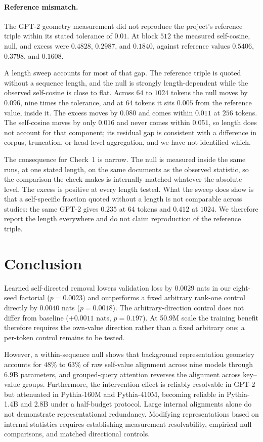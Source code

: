 \documentclass{article} %
\begin{document}
\paragraph{Reference mismatch.} The GPT-2 geometry measurement did not
reproduce the project's reference triple within its stated tolerance of
$0.01$. At block $512$ the measured self-cosine, null, and excess were
$0.4828$, $0.2987$, and $0.1840$, against reference values $0.5406$,
$0.3798$, and $0.1608$.

A length sweep accounts for most of that gap. The reference triple is quoted
without a sequence length, and the null is strongly length-dependent while the
observed self-cosine is close to flat. Across $64$ to $1024$ tokens the null
moves by $0.096$, nine times the tolerance, and at $64$ tokens it sits $0.005$
from the reference value, inside it. The excess moves by $0.080$ and comes
within $0.011$ at $256$ tokens. The self-cosine moves by only $0.016$ and
never comes within $0.051$, so length does not account for that component; its
residual gap is consistent with a difference in corpus, truncation, or
head-level aggregation, and we have not identified which.

The consequence for Check~1 is narrow. The null is measured inside the same
runs, at one stated length, on the same documents as the observed statistic,
so the comparison the check makes is internally matched whatever the absolute
level. The excess is positive at every length tested. What the sweep does show
is that a self-specific fraction quoted without a length is not comparable
across studies: the same GPT-2 gives $0.235$ at $64$ tokens and $0.412$ at
$1024$. We therefore report the length everywhere and do not claim
reproduction of the reference triple.

\section{Conclusion}

Learned self-directed removal lowers validation loss by $0.0029$ nats in our
eight-seed factorial ($p = 0.0023$) and outperforms a fixed arbitrary rank-one
control directly by $0.0040$ nats ($p = 0.0018$). The arbitrary-direction control
does not differ from baseline ($+0.0011$ nats, $p = 0.197$). At 50.9M scale the training benefit therefore
requires the own-value direction rather than a fixed arbitrary one; a
per-token control remains to be tested.

However, a within-sequence null shows that background representation geometry
accounts for $48\%$ to $63\%$ of raw self-value alignment across nine models
through 6.9B parameters, and grouped-query attention reverses the alignment
across key--value groups. Furthermore, the intervention effect is reliably
resolvable in GPT-2 but attenuated in Pythia-160M and Pythia-410M, becoming
reliable in Pythia-1.4B and 2.8B under a half-budget protocol. Large internal alignments alone
do not demonstrate representational redundancy. Modifying representations based
on internal statistics requires establishing measurement resolvability,
empirical null comparisons, and matched directional controls.
\end{document}
